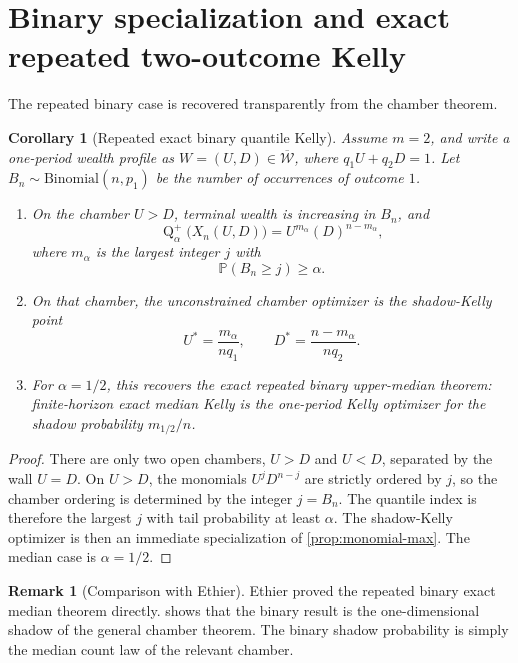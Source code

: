 \documentclass[11pt]{article}
\newtheorem{corollary}[corollary]{Corollary}
\theoremstyle{definition}
\newtheorem{remark}[remark]{Remark}
\newcommand{\Prob}{\mathbb{P}}
\newcommand{\1}{\mathbf{1}}
\newcommand{\Quant}{\operatorname{Q}}
\begin{document}
\section{Binary specialization and exact repeated two-outcome Kelly}

The repeated binary case is recovered transparently from the chamber theorem.

\begin{corollary}[Repeated exact binary quantile Kelly]\label{cor:binary}
Assume $m=2$, and write a one-period wealth profile as $W=(U,D)\in\overline{\mathcal W}$, where $q_1U+q_2D=1$. Let $B_n\sim\mathrm{Binomial}(n,p_1)$ be the number of occurrences of outcome $1$.
\begin{enumerate}[label=(\alph*), itemsep=3pt]
  \item On the chamber $U>D$, terminal wealth is increasing in $B_n$, and
  \[
  \Quant_\alpha^+\bigl(X_n(U,D)\bigr)=U^{m_\alpha}(D)^{n-m_\alpha},
  \]
  where $m_\alpha$ is the largest integer $j$ with
  \[
  \Prob(B_n\ge j)\ge \alpha.
  \]
  \item On that chamber, the unconstrained chamber optimizer is the shadow-Kelly point
  \[
  U^*=\frac{m_\alpha}{nq_1},
  \qquad
  D^*=\frac{n-m_\alpha}{nq_2}.
  \]
  \item For $\alpha=1/2$, this recovers the exact repeated binary upper-median theorem: finite-horizon exact median Kelly is the one-period Kelly optimizer for the shadow probability $m_{1/2}/n$.
\end{enumerate}
\end{corollary}

\begin{proof}
There are only two open chambers, $U>D$ and $U<D$, separated by the wall $U=D$. On $U>D$, the monomials $U^jD^{n-j}$ are strictly ordered by $j$, so the chamber ordering is determined by the integer $j=B_n$. The quantile index is therefore the largest $j$ with tail probability at least $\alpha$. The shadow-Kelly optimizer is then an immediate specialization of \cref{prop:monomial-max}. The median case is $\alpha=1/2$.
\end{proof}

\begin{remark}[Comparison with Ethier]
Ethier \cite{Ethier2004} proved the repeated binary exact median theorem directly.  shows that the binary result is the one-dimensional shadow of the general chamber theorem. The binary shadow probability is simply the median count law of the relevant chamber.
\end{remark}
\end{document}
